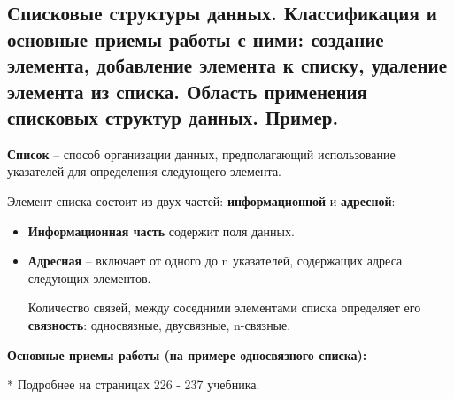 \newpage\subsection{Списковые  структуры  данных.  Классификация  и  основные  приемы  работы  с  ними:  создание элемента, добавление элемента к списку, удаление элемента из списка. Область применения списковых структур данных. Пример. }

\begin{myquote}
            
\end{myquote}

{\bf Список} – способ организации данных, предполагающий использование указателей для определения следующего элемента.

\noindent
Элемент списка состоит из двух частей: {\bf информационной} и {\bf адресной}:

\begin{itemize}
\item {\bf Информационная часть} содержит поля данных.

\item {\bf Адресная} – включает от одного до n указателей, содержащих адреса следующих элементов. 

Количество связей, между соседними элементами списка определяет его {\bf связность}: односвязные, двусвязные, n-связные.
\end{itemize}

\noindent
{\bf Основные приемы работы (на примере односвязного списка):}

\begin{myquote}
    {\it\small\begin{center} * Подробнее на страницах 226 - 237 учебника.\end{center}}
\end{myquote}

